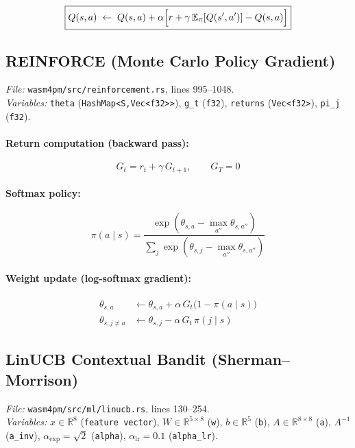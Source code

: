 \documentclass[11pt,a4paper]{article}
\begin{document}
\begin{equation}
  \boxed{Q(s,a) \;\leftarrow\; Q(s,a) + \alpha\Bigl[r + \gamma\,\mathbb{E}_\pi[Q(s',a')] - Q(s,a)\Bigr]}
\end{equation}

\subsection{REINFORCE (Monte Carlo Policy Gradient)}
\textit{File:} \texttt{wasm4pm/src/reinforcement.rs}, lines 995--1048.\\
\textit{Variables:} \texttt{theta} (\texttt{HashMap<S,Vec<f32>>}), \texttt{g\_t} (\texttt{f32}), \texttt{returns} (\texttt{Vec<f32>}), \texttt{pi\_j} (\texttt{f32}).

\paragraph{Return computation (backward pass):}
\begin{equation}
  G_t = r_t + \gamma\, G_{t+1}, \qquad G_T = 0
\end{equation}

\paragraph{Softmax policy:}
\begin{equation}
  \pi(a\mid s) = \frac{\exp(\theta_{s,a} - \max_{a''}\theta_{s,a''})}
                      {\sum_{j}\exp(\theta_{s,j} - \max_{a''}\theta_{s,a''})}
\end{equation}

\paragraph{Weight update (log-softmax gradient):}
\begin{align}
  \theta_{s,a} &\leftarrow \theta_{s,a} + \alpha\, G_t \bigl(1 - \pi(a\mid s)\bigr) \\
  \theta_{s,j\neq a} &\leftarrow \theta_{s,j} - \alpha\, G_t\, \pi(j\mid s)
\end{align}

\subsection{LinUCB Contextual Bandit (Sherman--Morrison)}
\textit{File:} \texttt{wasm4pm/src/ml/linucb.rs}, lines 130--254.\\
\textit{Variables:} $x\in\mathbb{R}^8$ (\texttt{feature vector}), $W\in\mathbb{R}^{5\times 8}$ (\texttt{w}), $b\in\mathbb{R}^5$ (\texttt{b}), $A\in\mathbb{R}^{8\times 8}$ (\texttt{a}), $A^{-1}$ (\texttt{a\_inv}), $\alpha_\text{exp}=\sqrt{2}$ (\texttt{alpha}), $\alpha_\text{lr}=0.1$ (\texttt{alpha\_lr}).
\end{document}
